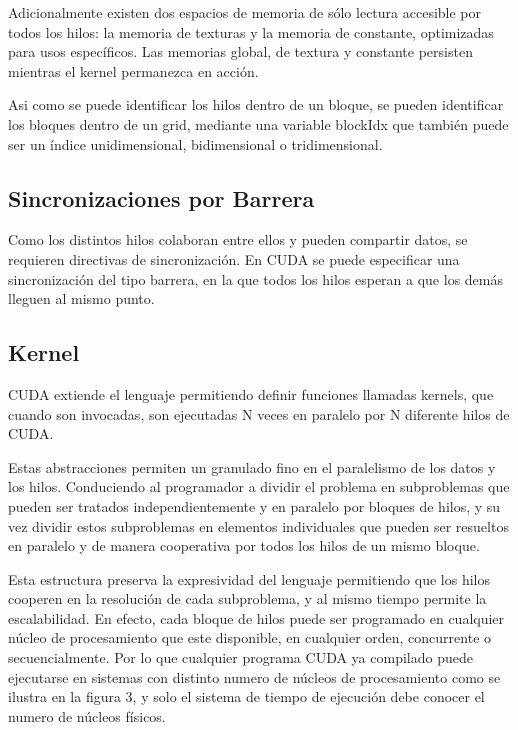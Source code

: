 \documentclass[twoside]{article}
\begin{document}
Adicionalmente existen dos espacios de memoria de sólo lectura accesible por todos los hilos: la memoria de texturas y la memoria de constante, optimizadas para usos específicos. Las memorias global, de textura y constante persisten mientras el kernel permanezca en acción.

Asi como se puede identificar los hilos dentro de un bloque, se pueden identificar los bloques dentro de un grid, mediante una variable blockIdx que también puede ser un índice unidimensional, bidimensional o tridimensional.

\subsection{Sincronizaciones por Barrera}

Como los distintos hilos colaboran entre ellos y pueden compartir datos, se requieren directivas de sincronización. En CUDA se puede especificar una sincronización del tipo barrera, en la que todos los hilos esperan a que los demás lleguen al mismo punto.

\subsection{Kernel}

CUDA extiende el lenguaje permitiendo definir funciones llamadas kernels, que cuando son invocadas, son ejecutadas N veces en paralelo por N diferente hilos de CUDA.

Estas abstracciones permiten un granulado fino en el paralelismo de los datos y los hilos. Conduciendo al programador a dividir el problema en subproblemas que pueden ser tratados independientemente y en paralelo por bloques de hilos, y su vez dividir estos subproblemas en elementos individuales que pueden ser resueltos en paralelo y de manera cooperativa por todos los hilos de un mismo bloque.

Esta estructura preserva la expresividad del lenguaje permitiendo que los hilos cooperen en la resolución de cada subproblema, y al mismo tiempo permite la escalabilidad. En efecto, cada bloque de hilos puede ser programado en cualquier núcleo de procesamiento que este disponible, en cualquier orden, concurrente o secuencialmente. Por lo que cualquier programa CUDA ya compilado puede ejecutarse en sistemas con distinto numero de núcleos de procesamiento como se ilustra en la figura 3, y solo el sistema de tiempo de ejecución debe conocer el numero de núcleos físicos.
\end{document}
